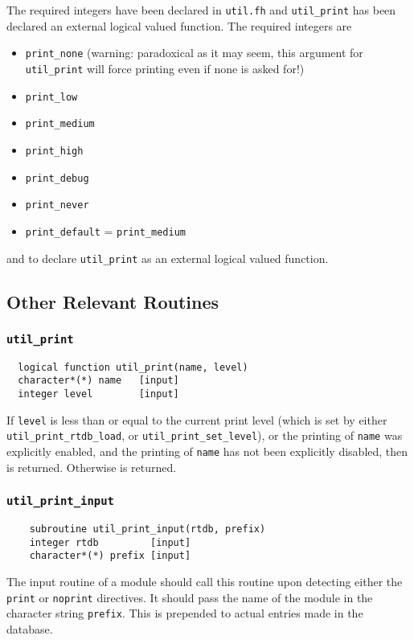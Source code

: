 The required integers have been declared in {\tt util.fh} and 
\verb+util_print+ has been declared an external logical valued function.
The required integers are
\begin{itemize}
\item \verb+print_none+ (warning: paradoxical as it may seem, this argument for
  \verb+util_print+ will force printing even if none is asked for!)
\item \verb+print_low+
\item \verb+print_medium+
\item \verb+print_high+
\item \verb+print_debug+
\item \verb+print_never+
\item \verb+print_default+ = \verb+print_medium+
\end{itemize}
and to declare \verb+util_print+ as an external logical valued function.

\subsection{Other Relevant Routines}

\subsubsection{{\tt util\_print}}
\sloppy
\begin{verbatim}
  logical function util_print(name, level)
  character*(*) name   [input]
  integer level        [input]
\end{verbatim}
If \verb+level+ is less than or equal to the current print level
(which is set by either \verb+util_print_rtdb_load+, or
\verb+util_print_set_level+), or the printing of \verb+name+ was
explicitly enabled, and the printing of \verb+name+ has not been
explicitly disabled, then \TRUE is returned.  Otherwise
\FALSE is returned.

\fussy

\subsubsection{{\tt util\_print\_input}}
\begin{verbatim}
    subroutine util_print_input(rtdb, prefix)
    integer rtdb         [input]
    character*(*) prefix [input]
\end{verbatim}
The input routine of a module should call this routine upon detecting
either the {\tt print} or {\tt noprint} directives.  It should pass
the name of the module in the character string {\tt prefix}.  This is
prepended to actual entries made in the database.

